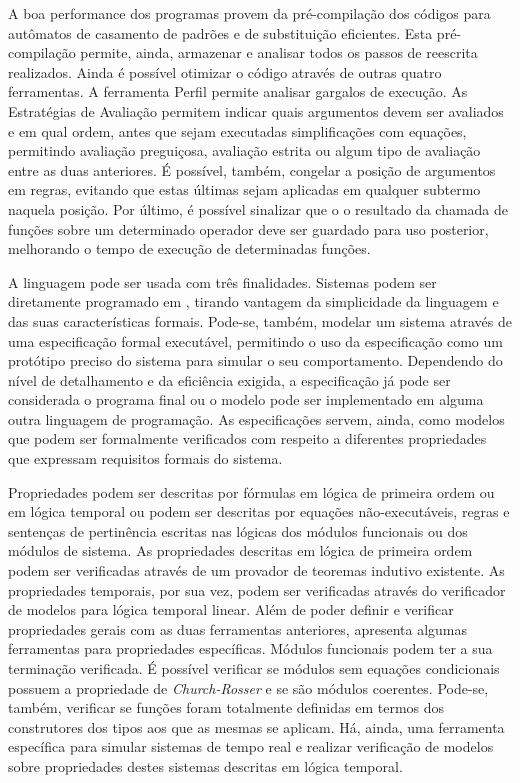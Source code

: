 A boa performance dos programas \Maude provem da pré-compilação dos códigos para autômatos de casamento de padrões e de substituição eficientes.
Esta pré-compilação permite, ainda, armazenar e analisar todos os passos de reescrita realizados.
Ainda é possível otimizar o código através de outras quatro ferramentas.
A ferramenta Perfil permite analisar gargalos de execução.
As Estratégias de Avaliação permitem indicar quais argumentos devem ser avaliados e em qual ordem, antes que sejam executadas simplificações com equações, permitindo avaliação preguiçosa, avaliação estrita ou algum tipo de avaliação entre as duas anteriores.
É possível, também, congelar a posição de argumentos em regras, evitando que estas últimas sejam aplicadas em qualquer subtermo naquela posição.
Por último, é possível sinalizar que o o resultado da chamada de funções sobre um determinado operador deve ser guardado para uso posterior, melhorando o tempo de execução de determinadas funções.

A linguagem \Maude pode ser usada com três finalidades.
Sistemas podem ser diretamente programado em \Maude, tirando vantagem da simplicidade da linguagem e das suas características formais.
Pode-se, também, modelar um sistema através de uma especificação formal executável, permitindo o uso da especificação como um protótipo preciso do sistema para simular o seu comportamento.
Dependendo do nível de detalhamento e da eficiência exigida, a especificação já pode ser considerada o programa final ou o modelo pode ser implementado em alguma outra linguagem de programação.
As especificações servem, ainda, como modelos que podem ser formalmente verificados com respeito a diferentes propriedades que expressam requisitos formais do sistema.

Propriedades podem ser descritas por fórmulas em lógica de primeira ordem ou em lógica temporal ou podem ser descritas por equações não-executáveis, regras e sentenças de pertinência escritas nas lógicas dos módulos funcionais ou dos módulos de sistema.
As propriedades descritas em lógica de primeira ordem podem ser verificadas através de um provador de teoremas indutivo existente.
As propriedades temporais, por sua vez, podem ser verificadas através do verificador de modelos para lógica temporal linear.
Além de poder definir e verificar propriedades gerais com as duas ferramentas anteriores, \Maude apresenta algumas ferramentas para propriedades específicas.
Módulos funcionais podem ter a sua terminação verificada.
É possível verificar se módulos sem equações condicionais possuem a propriedade de \textit{Church-Rosser} e se são módulos coerentes.
Pode-se, também, verificar se funções foram totalmente definidas em termos dos construtores dos tipos aos que as mesmas se aplicam.
Há, ainda, uma ferramenta específica para simular sistemas de tempo real e realizar verificação de modelos sobre propriedades destes sistemas descritas em lógica temporal.

